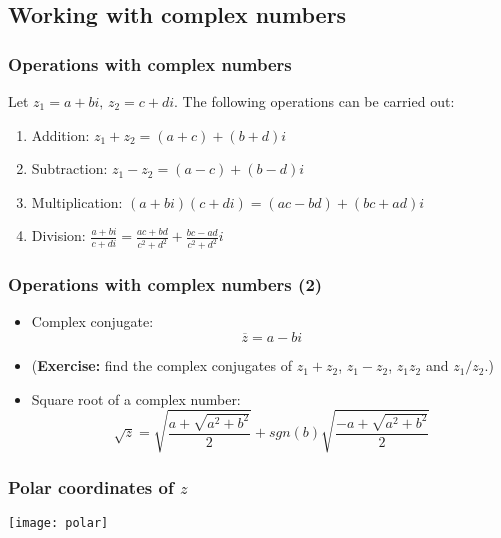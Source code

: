 \documentclass[10pt]{beamer}
\theoremstyle{definition}
\begin{document}
\subsection{Working with complex numbers}
\begin{frame}[fragile]
	\frametitle{Operations with complex numbers}
	Let $z_{1} = a + bi,\, z_{2} = c + di$. The following operations can be carried out:
	\begin{enumerate}
		\item Addition: $z_{1} + z_{2} = (a+c) + (b+d)i$
		\item Subtraction: $z_{1} - z_{2} = (a-c) + (b-d)i$
		\item Multiplication: $(a + bi)(c + di) = (ac - bd) + (bc + ad)i$
		\item Division: $\displaystyle\frac{a + bi}{c + di} = \frac{ac + bd}{c^{2} + d^{2}} + \frac{bc - ad}{c^{2} + d^{2}}i$
	\end{enumerate}
\end{frame}

\begin{frame}[fragile]
	\frametitle{Operations with complex numbers (2)}
	\begin{itemize}
		\item Complex conjugate:
		\[
		\overline{z} = a - bi
		\]
		\item (\textbf{Exercise:} find the complex conjugates of $z_{1} + z_{2}$, $z_{1} - z_{2}$, $z_{1} z_{2}$ and $z_{1}/z_{2}$.)
		
		\item Square root of a complex number:
		\[
		\sqrt{z} = \sqrt{\frac{a+\sqrt{a^{2} + b^{2}}}{2}} + sgn(b)\sqrt{\frac{-a+\sqrt{a^{2} + b^{2}}}{2}}
		\]
	\end{itemize}
\end{frame}

\begin{frame}[fragile]
	\frametitle{Polar coordinates of $z$}
	\centerline{\texttt{[image: polar]}}
\end{frame}
\end{document}
